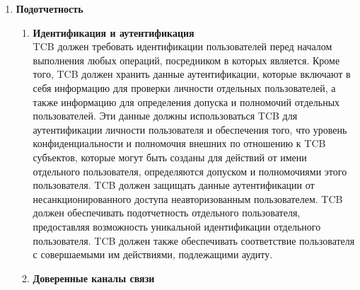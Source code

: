 \begin{enumerate}
\begin{enumerate}
\begin{enumerate}
\begin{enumerate}
                иерархическая классификация уровня конфиденциальности субъекта больше или равна иерархической классификации уровня конфиденциальности объекта, а неиерархические категории уровня
                конфиденциальности субъекта включают в себя все неиерархические категории уровня конфиденциальности объекта. Субъект может писать в объект только если иерархическая классификация
                уровня конфиденциальности субъекта меньше или равна иерархической классификации уровня конфиденциальности объекта, и все неиерархические категории уровня конфиденциальности
                субъекта включены в неиерархические категории уровня конфиденциальности объекта. Идентификационные и аутентификационные данные должны использоваться TCB для удостоверения
                личности пользователя и для обеспечения того, чтобы уровень конфиденциальности и авторизация субъектов, внешних для TCB, которые могут быть созданы для деятельности от имени
                отдельного пользователя, определялись уровнем доступа и авторизацией этого пользователя.
            \end{enumerate}
            \item{\textbf{Подотчетность}}
            \begin{enumerate}
                \item{\textbf{Идентификация и аутентификация}}\\
                TCB должен требовать идентификации пользователей перед началом выполнения любых операций, посредником в которых является. Кроме того, TCB должен хранить данные аутентификации,
                которые включают в себя информацию для проверки личности отдельных пользователей, а также информацию для определения допуска и полномочий отдельных пользователей. Эти данные должны
                использоваться TCB для аутентификации личности пользователя и обеспечения того, что уровень конфиденциальности и полномочия внешних по отношению к TCB субъектов, которые
                могут быть созданы для действий от имени отдельного пользователя, определяются допуском и полномочиями этого пользователя. TCB должен защищать данные аутентификации от
                несанкционированного доступа неавторизованным пользователем. TCB должен обеспечивать подотчетность отдельного пользователя, предоставляя возможность уникальной идентификации отдельного
                пользователя. TCB должен также обеспечивать соответствие пользователя с совершаемыми им действиями, подлежащими аудиту.
                \item{\textbf{Доверенные каналы	связи}}\\

\end{enumerate}
\end{enumerate}
\end{enumerate}
\end{enumerate}
